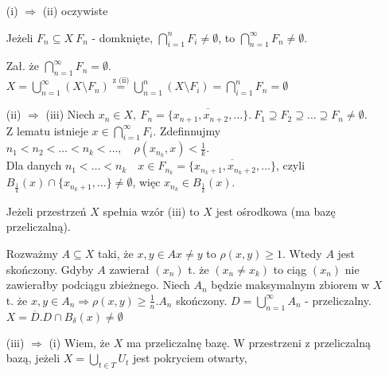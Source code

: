 \begin{dd} \hfill
    \begin{itemize}
        \item[(i) $\Rightarrow$ (ii)] oczywiste
        \begin{lem}
            Jeżeli $F_n \subseteq X \ F_n$ - domknięte, $\bigcap\limits_{i=1}^n F_i \neq \emptyset$, to $\bigcap\limits_{n=1}^\infty F_n \neq \emptyset$.
            \begin{dd} 
                Zał. że $\bigcap\limits_{n=1}^\infty F_n = \emptyset$. \\ 
                $ X = \bigcup\limits_{n=1}^\infty (X \setminus F_n) \overset{\text{z (ii)}}{=} \bigcup\limits_{n=1}^n(X \setminus F_i) = \bigcap\limits_{i=1}^n F_n = \emptyset$ \lightning
            \end{dd}
        \end{lem} 
        \item[(ii) $\Rightarrow$ (iii)] 
            Niech $x_n \in X, \ F_n = \overline{\{x_{n+1},x_{n+2},\ldots\}}. \ F_1 \supseteq F_2 \supseteq \ldots \supseteq F_n \neq \emptyset$.\\
            Z lematu istnieje $x \in \bigcap\limits_{i=1}^\infty F_i$. Zdefinnujmy $n_1 < n_2 < \ldots < n_k < \ldots, \quad \rho(x_{n_k},x) < \frac{1}{k}$. \\
            Dla danych $n_1 < \ldots < n_k \quad x \in F_{n_k} = \overline{\{x_{n_k+1},x_{n_k+2},\ldots\}}$, czyli $B_{\frac{1}{k}}(x) \cap \{x_{n_k+1},\ldots\} \neq \emptyset$, 
            więc $x_{n_k} \in B_{\frac{1}{k}}(x)$.
        \begin{lem} 
            Jeżeli przestrzeń $X$ spełnia wzór (iii) to $X$ jest ośrodkowa (ma bazę przeliczalną).
            \begin{dd} 
                Rozważmy $A \subseteq X$ taki, że $x,y \in A x \neq y$ to $\rho(x,y) \ge 1$. Wtedy $A$ jest skończony. Gdyby $A$ 
                zawierał $(x_n)$ t. że $(x_n \neq x_k)$ to ciąg $(x_n)$ nie zawierałby podciągu zbieżnego.
                Niech $A_n$ będzie maksymalnym zbiorem w $X$ t. że $x,y \in A_n \Rightarrow \rho(x,y) \ge \frac{1}{n}. A_n$ skończony. 
                $D = \bigcup\limits_{n=1}^\infty A_n$ - przeliczalny. $X = \overline{D}. D \cap B_\delta(x) \neq \emptyset$
            \end{dd} 
        \end{lem}
        \item[(iii) $\Rightarrow$ (i)] Wiem, że $X$ ma przeliczalnę bazę. W przestrzeni z przeliczalną bazą, jeżeli $X = \bigcup\limits_{t \in T}U_t$ jest pokryciem otwarty, 

\end{itemize}
\end{dd}
